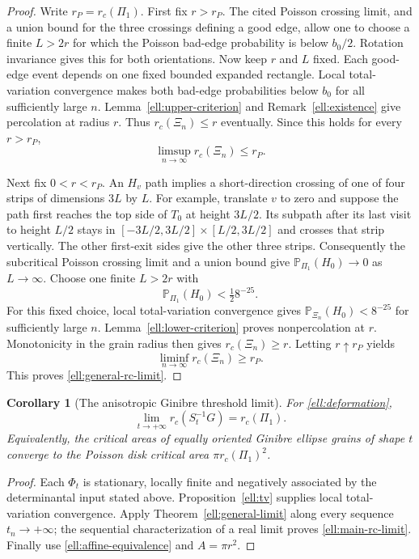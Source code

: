 \documentclass[11pt,a4paper]{article}
\newtheorem{corollary}[theorem]{Corollary}
\theoremstyle{definition}
\theoremstyle{remark}
\numberwithin{equation}{section}
\begin{document}
\begin{proof}
Write $r_P=r_c(\Pi_1)$.  First fix $r>r_P$.
The cited Poisson crossing limit, and a union bound for the three
crossings defining a good edge, allow one to choose a finite
$L>2r$ for which the Poisson bad-edge probability is below
$b_0/2$.  Rotation invariance gives this for both orientations.
Now keep $r$ and $L$ fixed.  Each good-edge event depends on one
fixed bounded expanded rectangle.  Local total-variation
convergence makes both bad-edge probabilities below $b_0$
for all sufficiently large $n$.  Lemma~\ref{ell:upper-criterion}
and Remark~\ref{ell:existence} give percolation at radius $r$.
Thus $r_c(\Xi_n)\le r$ eventually.  Since this holds for every
$r>r_P$,
\[
 \limsup_{n\to\infty}r_c(\Xi_n)\le r_P.
\]

Next fix $0<r<r_P$.  An $H_v$ path implies a short-direction
crossing of one of four strips of dimensions $3L$ by $L$.
For example, translate $v$ to zero and suppose the path first
reaches the top side of $T_0$ at height $3L/2$.  Its subpath
after its last visit to height $L/2$ stays in
$[-3L/2,3L/2]\times[L/2,3L/2]$ and crosses that strip vertically.
The other first-exit sides give the other three strips.
Consequently the subcritical Poisson crossing limit and a union
bound give $\mathbb P_{\Pi_1}(H_0)\to0$ as $L\to\infty$.
Choose one finite $L>2r$ with
\[
 \mathbb P_{\Pi_1}(H_0)<\tfrac12 8^{-25}.
\]
For this fixed choice, local total-variation convergence gives
$\mathbb P_{\Xi_n}(H_0)<8^{-25}$ for sufficiently large $n$.
Lemma~\ref{ell:lower-criterion} proves nonpercolation at $r$.
Monotonicity in the grain radius then gives
$r_c(\Xi_n)\ge r$.  Letting $r\uparrow r_P$ yields
\[
 \liminf_{n\to\infty}r_c(\Xi_n)\ge r_P.
\]
This proves \eqref{ell:general-rc-limit}.
\end{proof}

\begin{corollary}[The anisotropic Ginibre threshold limit]
\label{ell:ginibre-limit}
For \eqref{ell:deformation},
\begin{equation}\label{ell:main-rc-limit}
 \boxed{\displaystyle\lim_{t\to+\infty}r_c(S_t^{-1}G)
                         =r_c(\Pi_1).}
\end{equation}
Equivalently, the critical areas of equally oriented Ginibre
ellipse grains of shape $t$ converge to the Poisson disk critical
area $\pi r_c(\Pi_1)^2$.
\end{corollary}

\begin{proof}
Each $\Phi_t$ is stationary, locally finite and negatively
associated by the determinantal input stated above.
Proposition~\ref{ell:tv} supplies local total-variation convergence.
Apply Theorem~\ref{ell:general-limit} along every sequence
$t_n\to+\infty$; the sequential characterization of a real limit
proves \eqref{ell:main-rc-limit}.  Finally use
\eqref{ell:affine-equivalence} and $A=\pi r^2$.
\end{proof}
\end{document}
